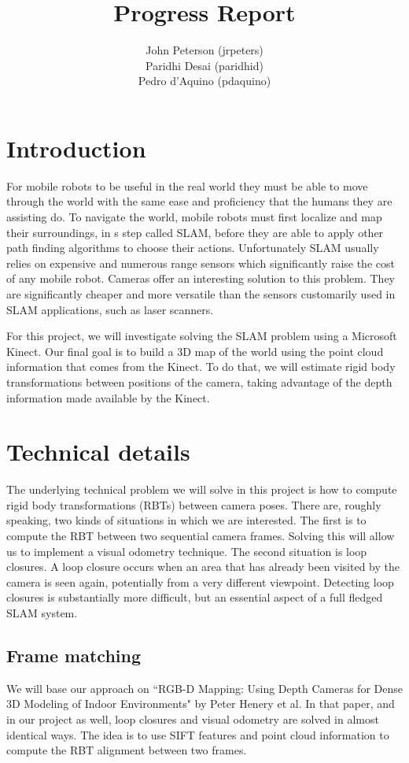 \documentclass[12pt]{article}
\title{Progress Report}
\author{
	John Peterson (jrpeters)\\
	Paridhi Desai (paridhid)\\
	Pedro d'Aquino (pdaquino)}
\begin{document}
\maketitle

\section{Introduction}
For mobile robots to be useful in the real world they must be able to move through the world 
with the same ease and proficiency that the humans they are assisting do.  To navigate the world, 
mobile robots must first localize and map their surroundings, in s step called SLAM, before they are 
able to apply other path finding algorithms to choose their actions.   Unfortunately SLAM usually relies 
on expensive and numerous range sensors which significantly raise the cost of any mobile robot. Cameras
offer an interesting solution to this problem.  They are significantly cheaper and more versatile than the 
sensors customarily used in SLAM applications, such as laser scanners.

For this project, we will investigate solving the SLAM problem using a Microsoft Kinect. Our final goal is
to build a 3D map of the world using the point cloud information that comes from the Kinect. To do that, we
will estimate rigid body transformations between positions of the camera, taking advantage of the depth information
made available by the Kinect.

\section{Technical details}
The underlying technical problem we will solve in this project is how to compute rigid body transformations (RBTs) between camera poses. There are, roughly speaking, two kinds of situations in which we are interested. The first is to compute the RBT between two sequential camera frames. Solving this will allow us to implement a visual odometry technique. The second situation is loop closures. A loop closure occurs when an area that has already been visited by the camera is seen again, potentially from a very different viewpoint. Detecting loop closures is substantially more difficult, but an essential aspect of a full fledged SLAM system.

\subsection{Frame matching}
We will base our approach on ``RGB-D Mapping: Using Depth Cameras for Dense 3D Modeling of Indoor Environments" by Peter Henery et al. In that paper, and in our project as well, loop closures and visual odometry are solved in almost identical ways. The idea is to use SIFT features and point cloud information to compute the RBT alignment between two frames.
\end{document}
